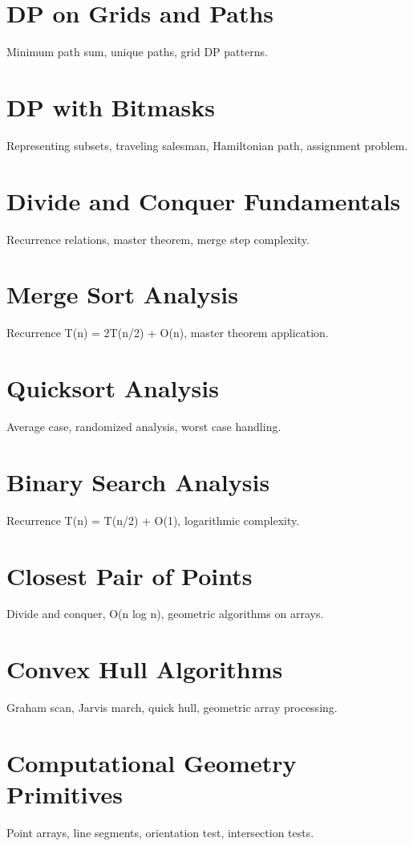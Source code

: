 \chapter{DP on Grids and Paths}
Minimum path sum, unique paths, grid DP patterns.

\chapter{DP with Bitmasks}
Representing subsets, traveling salesman, Hamiltonian path, assignment problem.

\chapter{Divide and Conquer Fundamentals}
Recurrence relations, master theorem, merge step complexity.

\chapter{Merge Sort Analysis}
Recurrence T(n) = 2T(n/2) + O(n), master theorem application.

\chapter{Quicksort Analysis}
Average case, randomized analysis, worst case handling.

\chapter{Binary Search Analysis}
Recurrence T(n) = T(n/2) + O(1), logarithmic complexity.

\chapter{Closest Pair of Points}
Divide and conquer, O(n log n), geometric algorithms on arrays.

\chapter{Convex Hull Algorithms}
Graham scan, Jarvis march, quick hull, geometric array processing.

\chapter{Computational Geometry Primitives}
Point arrays, line segments, orientation test, intersection tests.

